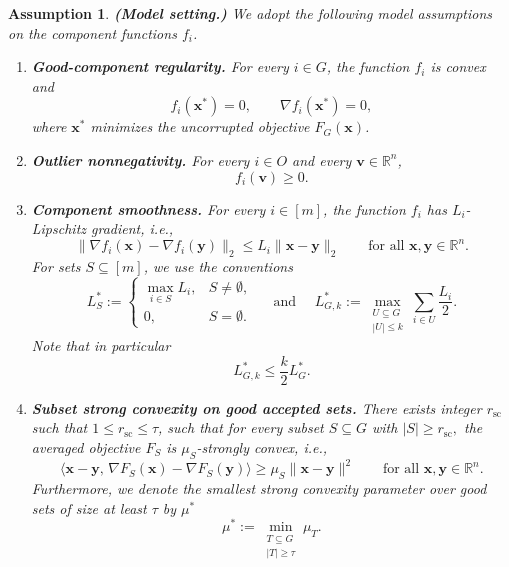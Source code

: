 \documentclass[11pt]{article}
\newcommand{\ve}[1]{\mathbf{#1}}
\newtheorem{assump}{Assumption}
\begin{document}
\begin{assump} {\textbf{(Model setting.)} We adopt the following model assumptions on the component functions $f_i$.}
\label{assump:sgd}


\begin{enumerate}[label=\Roman*., ref=\Roman*]
    \item \textbf{Good-component regularity.}
    For every $i\in G$, the function $f_i$ is convex and
    \[
    f_i(\ve{x}^*)=0,
    \qquad
    \nabla f_i(\ve{x}^*)=0,
    \] where $\ve{x}^*$ minimizes the uncorrupted objective $F_G(\ve{x})$.
    \label{ass:good_set_regularity}

    \item \textbf{Outlier nonnegativity.}
    For every $i\in O$ and every $\ve{v}\in\mathbb{R}^n$,
    \[
    f_i(\ve{v})\ge 0.
    \]\label{ass:outlier_nonnegativity}

    \item \textbf{Component smoothness.}
    For every $i\in [m]$, the function $f_i$ has $L_i$-Lipschitz gradient, i.e.,
    \[
    \|\nabla f_i(\ve{x})-\nabla f_i(\ve{y})\|_2
    \le
    L_i\|\ve{x}-\ve{y}\|_2
    \qquad
    \text{for all }\ve{x},\ve{y}\in\mathbb{R}^n.
    \]
    {For sets $S\subseteq [m]$, we use the conventions
    \begin{equation}\label{eq:lmax}
    L_{S}^*
    :=
    \begin{cases}
    \max_{i\in S}L_i, & S\neq\emptyset,\\
    0, & S=\emptyset.
    \end{cases}
    \quad \text{ and } \quad
    L_{G,k}^*
    :=
    \max_{\substack{U\subseteq G\\ |U|\le k}}
    \sum_{i\in U}\frac{L_i}{2}.
    \end{equation}
    Note that in particular
    \[
    L_{G,k}^*\le \frac{k}{2}{L_G^*}.
    \]}
    \label{ass:component_smoothness}
     \item
    \textbf{Subset strong convexity on good accepted sets.}
    There exists integer $r_{\mathrm{sc}}$ such that $1 \le r_{\mathrm{sc}} \le \tau$, such that for every subset $S\subseteq G$ with
    $
    |S|\ge r_{\mathrm{sc}},
    $
    the averaged objective $F_S$ is $\mu_S$-strongly convex, i.e.,
    \[
    \bigl\langle \ve{x}-\ve{y},\,
    \nabla F_S(\ve{x})-\nabla F_S(\ve{y})\bigr\rangle
    \ge
    \mu_S \|\ve{x}-\ve{y}\|^2
    \qquad
    \text{for all }\ve{x},\ve{y}\in\mathbb{R}^n.
    \]
    {Furthermore, we denote the smallest strong convexity parameter over good sets of size at least $\tau$ by $\mu^*$
    \[
    \mu^*
    :=
    \min_{\substack{T\subseteq G\\ |T|\ge \tau}}\mu_T.
    \]}


    \label{ass:subset_strong_convexity}
  \end{enumerate}
\end{assump}
\end{document}
